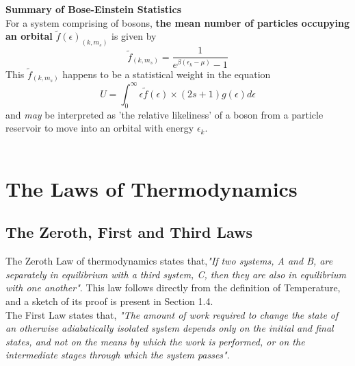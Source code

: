 \documentclass[oneside]{book}
\begin{document}
 \begin{mdframed}[style=exercise]
 \textbf{Summary of Bose-Einstein Statistics}\\
For a system comprising of bosons, \textbf{the mean number of particles occupying an orbital} $\tilde f(\epsilon)_{(k,m_s)} $ is given by \[ \tilde f_{(k,m_s)} = \frac{1}{e^{\beta(\epsilon_{k} - \mu)} - 1} \]
This $\tilde f_{(k,m_s)}$ happens to be a statistical weight in the equation 
\[  U =  \int_{0}^{\infty}\epsilon \tilde f(\epsilon) \times (2s+1)g(\epsilon)d\epsilon \]
and \emph{may} be interpreted as 'the relative likeliness' of a boson from a particle reservoir to move into an orbital with energy $\epsilon_k$.\\ \\


 \end{mdframed}
































\chapter{The Laws of Thermodynamics}
\section{The Zeroth, First and Third Laws}
The Zeroth Law of thermodynamics states that,\emph{"If two systems, A and B, are separately in equilibrium with a third system, C, then they are also in equilibrium with one another"}. This law follows directly from the definition of Temperature, and a sketch of its proof is present in Section 1.4.\\

The First Law states that, \emph{"The amount of work required to change the state of an otherwise adiabatically isolated system depends only on the initial and final states, and not on the means by which the work is performed, or on the intermediate stages through which the system passes"}.\\
\end{document}
